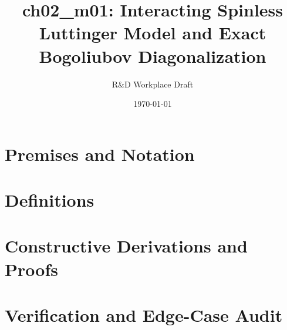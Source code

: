 \documentclass[11pt,a4paper]{article}
\title{\textbf{ch02\_m01: Interacting Spinless Luttinger Model and Exact Bogoliubov Diagonalization}}
\author{R\&D Workplace Draft}
\date{\today}
\theoremstyle{definition}
\theoremstyle{plain}
\theoremstyle{remark}
\begin{document}
\maketitle

\section{Premises and Notation}

\section{Definitions}

\section{Constructive Derivations and Proofs}

\section{Verification and Edge-Case Audit}
\end{document}
